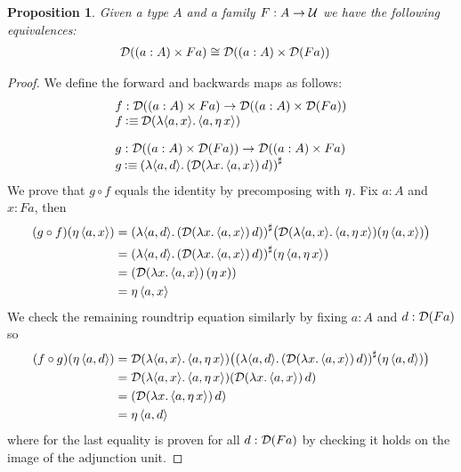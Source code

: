 \documentclass[11pt]{article}
\newtheorem{prop}[thrm]{Proposition}
\begin{document}
\begin{prop}\label{prop:boxed-sigma-boxed}
  Given a type \(A\) and a family \(F : A \to \mathcal{U}\) we have the following
  equivalences:
  \begin{align*}
    \mathcal{D}{({(a : A)}\times{Fa})}
    &\cong
    \mathcal{D}{({(a : A)}\times{\mathcal{D}{(Fa)}})}
  \end{align*}
\end{prop}
\begin{proof}
  We define the forward and backwards maps as follows:
  \[
    \begin{array}{l}
      f : {{\mathcal{D}{({(a : A)}\times{Fa})}}\to{\mathcal{D}{({(a : A)}\times{\mathcal{D}{(Fa)}})}}}
      \\
      f \mathbin{\vcentcolon\equiv} \mathcal{D}{({\mathop{\lambda{\langle{a},{x}\rangle}.}{\langle{a},{\eta\,{x}}\rangle}})}
      \\[1em]
      g : {{\mathcal{D}{({(a : A)}\times{\mathcal{D}{(Fa)}})}}\to{\mathcal{D}{({(a : A)}\times{Fa})}}}
      \\
      g \mathbin{\vcentcolon\equiv} {({\mathop{\lambda{\langle{a},{d}\rangle}.}{(\mathcal{D}{({\mathop{\lambda{x}.}{\langle{a},{x}\rangle}})}\,d)}})}^\sharp
    \end{array}
  \]
  We prove that \(g \circ f\) equals the identity by precomposing
  with \(\eta\).
  Fix \(a:A\) and \(x:Fa\), then
  \begin{align*}
    (g \circ f)(\eta\,{\langle{a},{x}\rangle})
    &=
      {({\mathop{\lambda{\langle{a},{d}\rangle}.}{(\mathcal{D}{({\mathop{\lambda{x}.}{\langle{a},{x}\rangle}})}\,d)}})}^\sharp
      \big(\mathcal{D}{({\mathop{\lambda{\langle{a},{x}\rangle}.}{\langle{a},{\eta\,{x}}\rangle}})}(\eta\,{\langle{a},{x}\rangle})\big)
    \\
    &=
      {({\mathop{\lambda{\langle{a},{d}\rangle}.}{(\mathcal{D}{({\mathop{\lambda{x}.}{\langle{a},{x}\rangle}})}\,d)}})}^\sharp
      (\eta\,{\langle{a},{\eta\,{x}}\rangle})
    \\
    &=
      (\mathcal{D}{({\mathop{\lambda{x}.}{\langle{a},{x}\rangle}})}\,(\eta\,{x}))
    \\
    &= \eta\,{\langle{a},{x}\rangle}
  \end{align*}
  We check the remaining roundtrip equation similarly by fixing \(a:A\) and
  \(d:\mathcal{D}{(Fa)}\) so
  \begin{align*}
    (f \circ g)(\eta\,{\langle{a},{d}\rangle})
    &=
      \mathcal{D}{({\mathop{\lambda{\langle{a},{x}\rangle}.}{\langle{a},{\eta\,{x}}\rangle}})}
      \big({({\mathop{\lambda{\langle{a},{d}\rangle}.}{(\mathcal{D}{({\mathop{\lambda{x}.}{\langle{a},{x}\rangle}})}\,d)}})}^\sharp(\eta\,{\langle{a},{d}\rangle})\big)
    \\
    &=
      \mathcal{D}{({\mathop{\lambda{\langle{a},{x}\rangle}.}{\langle{a},{\eta\,{x}}\rangle}})}
      (\mathcal{D}{({\mathop{\lambda{x}.}{\langle{a},{x}\rangle}})}\,d)
    \\
    &=
      (\mathcal{D}{({\mathop{\lambda{x}.}{\langle{a},{\eta\,{x}}\rangle}})}\,d)
    \\
    &= \eta\,{\langle{a},{d}\rangle}
  \end{align*}
  where for the last equality is proven for all \(d:\mathcal{D}{(Fa)}\) by checking
  it holds on the image of the adjunction unit.
\end{proof}
\end{document}
